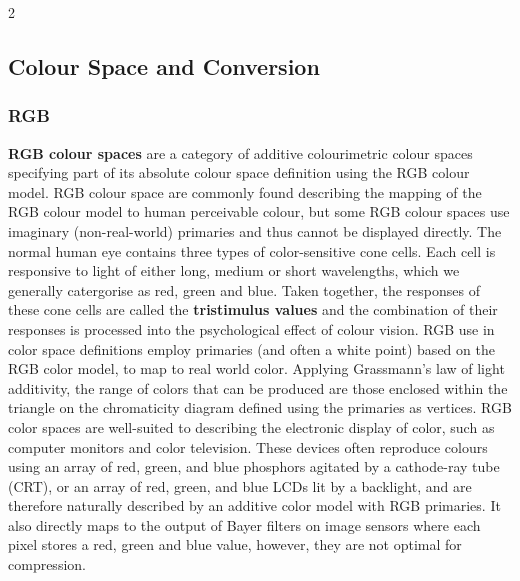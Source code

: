 \documentclass[10pt]{article}
\begin{document}
\begin{multicols}{2}
\subsection{Colour Space and Conversion}
\subsubsection{RGB}
\textbf{RGB colour spaces} are a category of additive colourimetric colour spaces specifying part of its absolute colour space definition using the RGB colour model.
\newline \newline
RGB colour space are commonly found describing the mapping of the RGB colour model to human perceivable colour, but some RGB colour spaces use imaginary (non-real-world) primaries and thus cannot be displayed directly.
\newline \newline
The normal human eye contains three types of color-sensitive cone cells. Each cell is responsive to light of either long, medium or short wavelengths, which we generally catergorise as red, green and blue. Taken together, the responses of these cone cells are called the \textbf{tristimulus values} and the combination of their responses is processed into the psychological effect of colour vision.
RGB use in color space definitions employ primaries (and often a white point) based on the RGB color model, to map to real world color. Applying Grassmann's law of light additivity, the range of colors that can be produced are those enclosed within the triangle on the chromaticity diagram defined using the primaries as vertices.
\newline \newline
RGB color spaces are well-suited to describing the electronic display of color, such as computer monitors and color television. These devices often reproduce colours using an array of red, green, and blue phosphors agitated by a cathode-ray tube (CRT), or an array of red, green, and blue LCDs lit by a backlight, and are therefore naturally described by an additive color model with RGB primaries.
It also directly maps to the output of Bayer filters on image sensors where each pixel stores a red, green and blue value, however, they are not optimal for compression.


\end{multicols}
\end{document}
